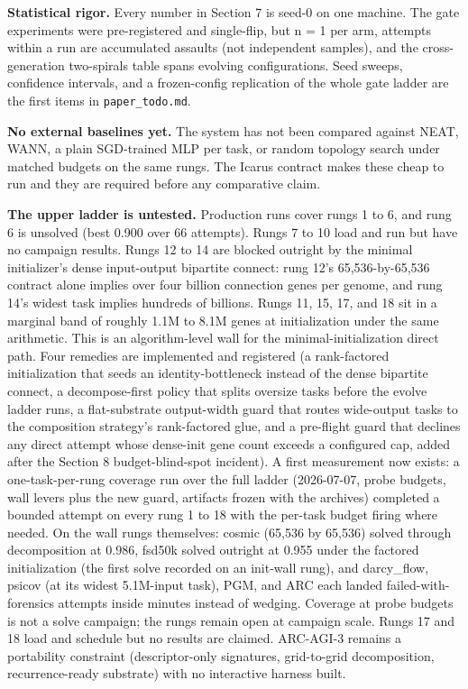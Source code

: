 \documentclass[11pt]{article}
\begin{document}
\textbf{Statistical rigor.} Every number in Section 7 is seed-0 on one machine. The gate experiments were pre-registered and single-flip, but n = 1 per arm, attempts within a run are accumulated assaults (not independent samples), and the cross-generation two-spirals table spans evolving configurations. Seed sweeps, confidence intervals, and a frozen-config replication of the whole gate ladder are the first items in \texttt{paper_todo.md}.

\textbf{No external baselines yet.} The system has not been compared against NEAT, WANN, a plain SGD-trained MLP per task, or random topology search under matched budgets on the same rungs. The Icarus contract makes these cheap to run and they are required before any comparative claim.

\textbf{The upper ladder is untested.} Production runs cover rungs 1 to 6, and rung 6 is unsolved (best 0.900 over 66 attempts). Rungs 7 to 10 load and run but have no campaign results. Rungs 12 to 14 are blocked outright by the minimal initializer's dense input-output bipartite connect: rung 12's 65,536-by-65,536 contract alone implies over four billion connection genes per genome, and rung 14's widest task implies hundreds of billions. Rungs 11, 15, 17, and 18 sit in a marginal band of roughly 1.1M to 8.1M genes at initialization under the same arithmetic. This is an algorithm-level wall for the minimal-initialization direct path. Four remedies are implemented and registered (a rank-factored initialization that seeds an identity-bottleneck instead of the dense bipartite connect, a decompose-first policy that splits oversize tasks before the evolve ladder runs, a flat-substrate output-width guard that routes wide-output tasks to the composition strategy's rank-factored glue, and a pre-flight guard that declines any direct attempt whose dense-init gene count exceeds a configured cap, added after the Section 8 budget-blind-spot incident). A first measurement now exists: a one-task-per-rung coverage run over the full ladder (2026-07-07, probe budgets, wall levers plus the new guard, artifacts frozen with the archives) completed a bounded attempt on every rung 1 to 18 with the per-task budget firing where needed. On the wall rungs themselves: cosmic (65,536 by 65,536) solved through decomposition at 0.986, fsd50k solved outright at 0.955 under the factored initialization (the first solve recorded on an init-wall rung), and darcy_flow, psicov (at its widest 5.1M-input task), PGM, and ARC each landed failed-with-forensics attempts inside minutes instead of wedging. Coverage at probe budgets is not a solve campaign; the rungs remain open at campaign scale. Rungs 17 and 18 load and schedule but no results are claimed. ARC-AGI-3 remains a portability constraint (descriptor-only signatures, grid-to-grid decomposition, recurrence-ready substrate) with no interactive harness built.
\end{document}
